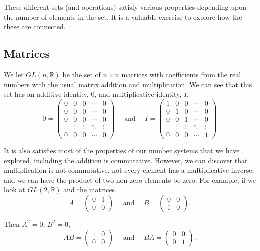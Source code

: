 \documentclass[
]{book}
\theoremstyle{definition}
\theoremstyle{definition}
\theoremstyle{definition}
\theoremstyle{remark}
\begin{document}
These different sets (and operations) satisfy various properties depending upon the number of elements in the set. It is a valuable exercise to explore how the these are connected.

\hypertarget{matrices}{%
\subsection{Matrices}\label{matrices}}

We let \(GL(n,\mathbb{R})\) be the set of \(n\times n\) matrices with coefficients from the real numbers with the usual matrix addition and multiplication. We can see that this set has an additive identity, \(0\), and multiplicative identity, \(I\).
\[0 = \begin{pmatrix}
 0 & 0 & 0 & \cdots & 0 \\
 0 & 0 & 0 & \cdots & 0 \\
 0 & 0 & 0 & \cdots & 0 \\
 \vdots & \vdots & \vdots & \ddots & 
 \vdots \\
 0 & 0 & 0 & \cdots & 0 
\end{pmatrix} \quad \mbox{ and } \quad  I= \begin{pmatrix}
 1 & 0 & 0 & \cdots & 0 \\
 0 & 1 & 0 & \cdots & 0 \\
 0 & 0 & 1 & \cdots & 0 \\
 \vdots & \vdots & \vdots & \ddots & 
 \vdots \\
 0 & 0 & 0 & \cdots & 1 
\end{pmatrix}\]

It is also satisfies most of the properties of our number systems that we have explored, including the addition is commutative. However, we can discover that multiplication is not commutative, not every element has a multiplicative inverse, and we can have the product of two non-zero elements be zero. For example, if we look at \(GL(2,\mathbb{R})\) and the matrices
\[A = \begin{pmatrix}
0 & 1 \\
0 & 0
\end{pmatrix} \quad \mbox{ and } \quad 
B= \begin{pmatrix}
0 & 0 \\
1 & 0
\end{pmatrix}.\]

Then \(A^2=0\), \(B^2=0\),
\[AB=\begin{pmatrix}
1 & 0 \\
0 & 0
\end{pmatrix} \quad \mbox{ and } \quad 
BA= \begin{pmatrix}
0 & 0 \\
0 & 1
\end{pmatrix}.\]
\end{document}
